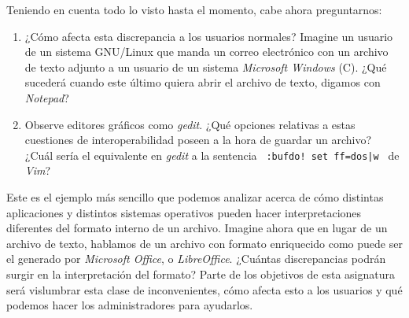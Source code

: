 \documentclass[12pt]{article}
\begin{document}
Teniendo en cuenta todo lo visto hasta el momento, cabe ahora preguntarnos: 

\begin{enumerate}

    \item ¿Cómo afecta esta discrepancia a los usuarios normales? Imagine un
    usuario de un sistema GNU/Linux que manda un correo electrónico con un
    archivo de texto adjunto a un usuario de un sistema \emph{Microsoft
    Windows} (C). ¿Qué sucederá cuando este último quiera abrir el archivo de
    texto, digamos con \emph{Notepad}?

    \item Observe editores gráficos como \emph{gedit}. ¿Qué opciones relativas
    a estas cuestiones de interoperabilidad poseen a la hora de guardar un
    archivo? ¿Cuál sería el equivalente en  \emph{gedit} a la sentencia {\tt
    :bufdo! set ff=dos|w } de \emph{Vim}? 

\end{enumerate}
     
Este es el ejemplo más sencillo que podemos analizar acerca de cómo distintas
aplicaciones y distintos sistemas operativos pueden hacer interpretaciones
diferentes del formato interno de un archivo. Imagine ahora que en lugar de un
archivo de texto, hablamos de un archivo con formato enriquecido como puede
ser el generado por \emph{Microsoft Office}, o \emph{LibreOffice}. ¿Cuántas
discrepancias podrán surgir en la interpretación del formato? Parte de los
objetivos de esta asignatura será vislumbrar esta clase de inconvenientes,
cómo afecta esto a los usuarios y qué podemos hacer los administradores para
ayudarlos. 
\end{document}
